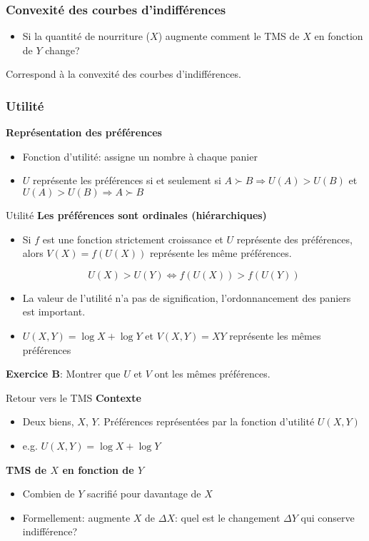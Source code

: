 \documentclass[handout]{beamer}
\begin{document}
\begin{frame}\frametitle{Convexité des courbes d'indifférences}
\begin{itemize}
\item Si la quantité de nourriture ($X$) augmente comment le TMS de $X$ en fonction de $Y$ change?
\end{itemize}

Correspond à la convexité des courbes d'indifférences. 
\end{frame}

\begin{frame}\frametitle{Utilité}

\textbf{Représentation des préférences}
\begin{itemize}
\item  Fonction d'utilité: assigne un nombre à chaque panier
\item $U$ représente les préférences si et seulement si $ A \succ B \Rightarrow U(A) > U(B)$ et 
$ U(A) > U(B)   \Rightarrow A \succ B$
\end{itemize}
\vfill
\end{frame}

\begin{frame}{Utilité}
\textbf{Les préférences sont ordinales (hiérarchiques)}
\begin{itemize}
\item Si $f$ est une fonction strictement croissance et $U$ représente des préférences, alors $V(X) = f(U(X))$ représente les même préférences.

$$ U(X) > U(Y) \iff f(U(X)) > f(U(Y))$$
\item La valeur de l'utilité n'a pas de signification, l'ordonnancement des paniers est important.
\item $U(X,Y) = \log X + \log Y$ et $V(X,Y) = XY$ représente les mêmes préférences
\end{itemize}
\textbf{Exercice B}: Montrer que $U$ et $V$ ont les mêmes préférences. 
\end{frame}


\begin{frame}{Retour vers le TMS}
\textbf{Contexte}
\begin{itemize}
\item Deux biens, $X$, $Y$.  Préférences représentées par la fonction d'utilité $U(X,Y)$
\item e.g. $U(X,Y) = \log X + \log Y$
\end{itemize}
\textbf{TMS de $X$ en fonction de $Y$} \pause
\begin{itemize}
\item Combien de $Y$ sacrifié pour davantage de $X$\pause
\item Formellement: augmente $X$ de $\Delta X$: quel est le changement $\Delta Y $ qui conserve indifférence?
\end{itemize}
\end{frame}
\end{document}
